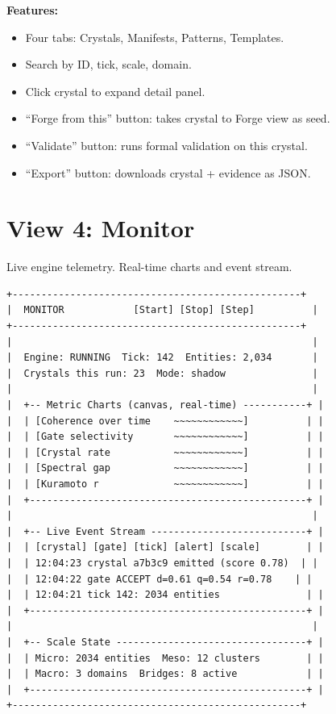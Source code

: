 \documentclass[11pt,a4paper,twoside]{article}
\begin{document}
\textbf{Features:}
\begin{itemize}[nosep]
  \item Four tabs: Crystals, Manifests, Patterns, Templates.
  \item Search by ID, tick, scale, domain.
  \item Click crystal to expand detail panel.
  \item ``Forge from this'' button: takes crystal to Forge view
        as seed.
  \item ``Validate'' button: runs formal validation on this crystal.
  \item ``Export'' button: downloads crystal + evidence as JSON.
\end{itemize}


\section{View 4: Monitor}\label{sec:monitor}

Live engine telemetry. Real-time charts and event stream.

\begin{lstlisting}[title={Monitor Layout}]
+--------------------------------------------------+
|  MONITOR            [Start] [Stop] [Step]          |
+--------------------------------------------------+
|                                                    |
|  Engine: RUNNING  Tick: 142  Entities: 2,034       |
|  Crystals this run: 23  Mode: shadow               |
|                                                    |
|  +-- Metric Charts (canvas, real-time) -----------+ |
|  | [Coherence over time    ~~~~~~~~~~~~]          | |
|  | [Gate selectivity       ~~~~~~~~~~~~]          | |
|  | [Crystal rate           ~~~~~~~~~~~~]          | |
|  | [Spectral gap           ~~~~~~~~~~~~]          | |
|  | [Kuramoto r             ~~~~~~~~~~~~]          | |
|  +------------------------------------------------+ |
|                                                    |
|  +-- Live Event Stream ---------------------------+ |
|  | [crystal] [gate] [tick] [alert] [scale]        | |
|  | 12:04:23 crystal a7b3c9 emitted (score 0.78)  | |
|  | 12:04:22 gate ACCEPT d=0.61 q=0.54 r=0.78    | |
|  | 12:04:21 tick 142: 2034 entities               | |
|  +------------------------------------------------+ |
|                                                    |
|  +-- Scale State ---------------------------------+ |
|  | Micro: 2034 entities  Meso: 12 clusters        | |
|  | Macro: 3 domains  Bridges: 8 active            | |
|  +------------------------------------------------+ |
+--------------------------------------------------+
\end{lstlisting}
\end{document}
